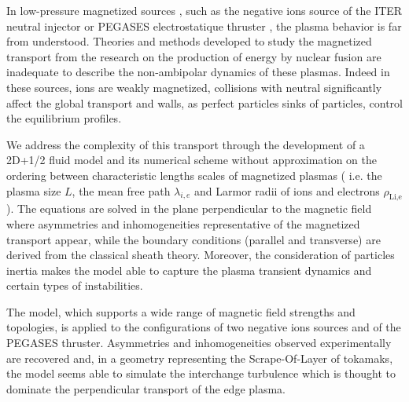In low-pressure magnetized sources , such as the negative ions source of the
ITER neutral injector or PEGASES electrostatique thruster , the plasma behavior
is far from understood. Theories and methods developed to study the magnetized
transport from the research on the production of energy by nuclear fusion are
inadequate to describe the non-ambipolar dynamics of these plasmas.
Indeed in these sources, ions are weakly magnetized, collisions with neutral
significantly affect the global transport and walls, as perfect particles sinks
of particles, control the equilibrium profiles.

We address the complexity of this transport through the development of a 2D+1/2
fluid model and its numerical scheme without approximation on the ordering
between characteristic lengths scales of magnetized plasmas ( i.e. the plasma
size $L$, the mean free path $\lambda_{i,e}$ and Larmor radii of ions and
electrons $\rho_\text{Li,e}$).
The equations are solved in the plane perpendicular to the magnetic field where
asymmetries and inhomogeneities representative of the magnetized transport
appear, while the boundary conditions (parallel and transverse) are derived
from the classical sheath theory. Moreover, the consideration of particles
inertia makes the model able to capture the plasma transient dynamics and
certain types of instabilities.
	
The model, which supports a wide range of magnetic field strengths and
topologies, is applied to the configurations of two negative ions sources and of
the PEGASES thruster. Asymmetries and inhomogeneities observed experimentally
are recovered and, in a geometry representing the Scrape-Of-Layer of tokamaks,
the model seems able to simulate the interchange turbulence which is thought to
dominate the perpendicular transport of the edge plasma.
		  
		
